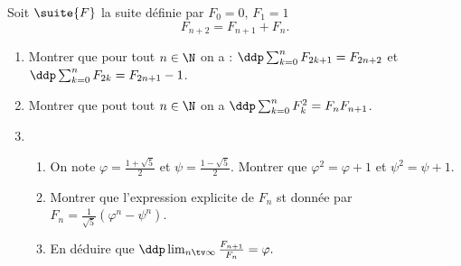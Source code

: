 \documentclass[a4paper, 11pt,reqno]{article}
\begin{document}
\begin{exercice}
Soit $\suite{F}$ la suite définie par $F_0 =0, \, F_1=1 $  
$$ F_{n+2} = F_{n+1} +F_n.$$

\begin{enumerate}
\item Montrer que pour tout $n\in \N$ on a : $\ddp \sum_{k=0}^n F_{2k+1} =F_{2n+2}$
et $\ddp \sum_{k=0}^n F_{2k} =F_{2n+1}-1$.
\item Montrer que pout tout $n\in \N$ on a $\ddp \sum_{k=0}^n F_{k}^2 =F_nF_{n+1}$.
\item \begin{enumerate}
\item On note $\varphi = \frac{1+\sqrt{5}}{2}$ et $\psi=\frac{1-\sqrt{5}}{2}$. Montrer que 
$\varphi^2 =\varphi+1$ et $\psi^2 =\psi+1$.
\item Montrer que l'expression explicite de $F_n$ st donnée par $F_n =\frac{1}{\sqrt{5}}(\varphi^n-\psi^n)$.
\item En déduire que $\ddp \lim_{n\tv \infty} \frac{F_{n+1}}{F_n}=\varphi.$
\end{enumerate}
\end{enumerate}

\end{exercice}
\end{document}
